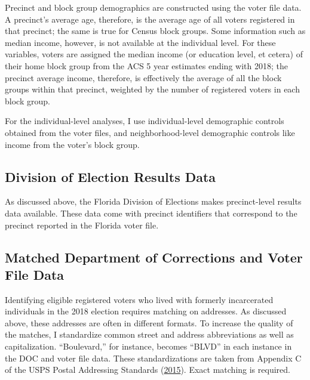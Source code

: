 \documentclass[
  12pt,
]{article}
\begin{document}
Precinct and block group demographics are constructed using the voter file data. A precinct's average age, therefore, is the average age of all voters registered in that precinct; the same is true for Census block groups. Some information such as median income, however, is not available at the individual level. For these variables, voters are assigned the median income (or education level, et cetera) of their home block group from the ACS 5 year estimates ending with 2018; the precinct average income, therefore, is effectively the average of all the block groups within that precinct, weighted by the number of registered voters in each block group.

For the individual-level analyses, I use individual-level demographic controls obtained from the voter files, and neighborhood-level demographic controls like income from the voter's block group.

\hypertarget{division-of-election-results-data}{%
\subsection*{Division of Election Results Data}\label{division-of-election-results-data}}

As discussed above, the Florida Division of Elections makes precinct-level results data available. These data come with precinct identifiers that correspond to the precinct reported in the Florida voter file.

\hypertarget{matched-department-of-corrections-and-voter-file-data}{%
\subsection*{Matched Department of Corrections and Voter File Data}\label{matched-department-of-corrections-and-voter-file-data}}

Identifying eligible registered voters who lived with formerly incarcerated individuals in the 2018 election requires matching on addresses. As discussed above, these addresses are often in different formats. To increase the quality of the matches, I standardize common street and address abbreviations as well as capitalization. ``Boulevard,'' for instance, becomes ``BLVD'' in each instance in the DOC and voter file data. These standardizations are taken from Appendix C of the USPS Postal Addressing Standards (\protect\hyperlink{ref-USPS2015}{2015}). Exact matching is required.
\end{document}
